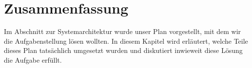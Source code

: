 \section{Zusammenfassung}

Im Abschnitt zur Systemarchitektur wurde unser Plan vorgestellt, mit dem wir die Aufgabenstellung
lösen wollten.
In diesem Kapitel wird erläutert, welche Teile dieses Plan tatsächlich umgesetzt wurden und
diskutiert inwieweit diese Lösung die Aufgabe erfüllt.




